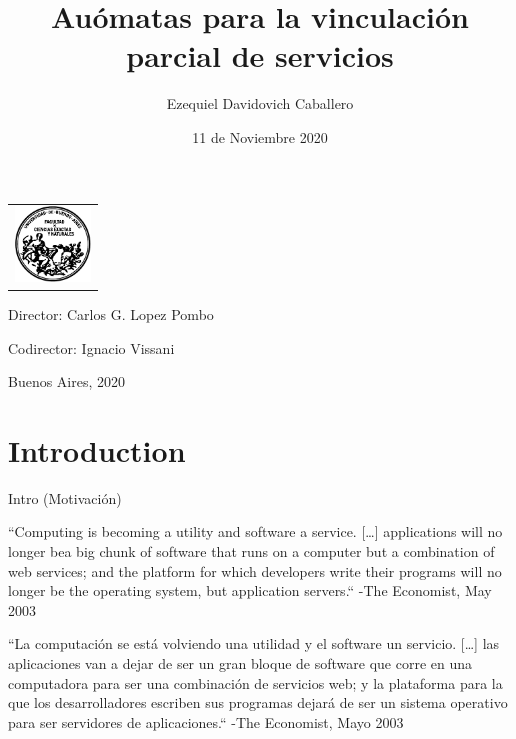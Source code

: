 \documentclass[10pt,xcolor={table,dvipsnames},t]{beamer}
\title{Auómatas para la vinculación parcial de servicios}
\author{Ezequiel Davidovich Caballero}
\institute{Departamento de Computación, Facultad de Ciencias Exactas y Naturales, Universidad de Buenos Aires}
\date{11 de Noviembre 2020}
\begin{document}
\begin{frame}
\begin{center}
\begin{tabular}{l}
\includegraphics[width=2cm]{logofcen.pdf}
\end{tabular}    
\end{center}

  \titlepage
  
  

{Director: Carlos G. Lopez Pombo}

\vspace{.2cm}

{Codirector: Ignacio Vissani}

\vspace{.2cm}

Buenos Aires, 2020

\end{frame}


\section{Introduction}
\begin{frame}{Intro (Motivación)}

 \vspace{\fill}
``Computing is becoming a utility and software a service. […] applications will no longer bea big chunk of software that runs on a computer but a combination of web services; and the platform for which developers write their programs will no longer be the operating system, but application servers.`` -The Economist, May 2003\\
 \vspace{\fill}
 
``La computación se está volviendo una utilidad y el software un servicio. […] las aplicaciones van a dejar de ser un gran bloque de software que corre en una computadora para ser una combinación de servicios web; y la plataforma para la que los desarrolladores escriben sus programas dejará de ser un sistema operativo para ser servidores de aplicaciones.`` -The Economist, Mayo 2003
 \vspace{\fill}
\end{frame}
\end{document}

